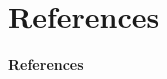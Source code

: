 \documentclass[serif]{beamer}\usepackage[]{graphicx}\usepackage[]{color}
\begin{document}
\section{References}
\begin{frame}[t,shrink]{\textbf{References}}
\tiny
{}


% 
\end{frame}
\end{document}
